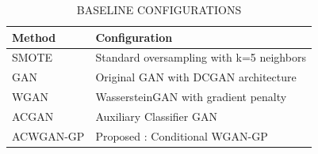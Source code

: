 \begin{table}[htbp]
\centering
\caption{BASELINE CONFIGURATIONS}
\label{tab:baselines}
\begin{tabular}{ll}
\toprule
Method & Configuration \\
\midrule
SMOTE & Standard oversampling with k=5 neighbors \\
GAN & Original GAN with DCGAN architecture \\
WGAN & WassersteinGAN with gradient penalty \\
ACGAN & Auxiliary Classifier GAN \\
ACWGAN-GP & Proposed : Conditional WGAN-GP \\
\bottomrule
\end{tabular}
\end{table}

